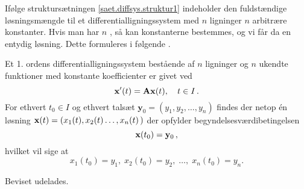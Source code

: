 Ifølge struktursætningen \ref{saet.diffsys.struktur1} indeholder den fuldstændige løsningsmængde til et differentialligningssystem med $ n $ ligninger $ n $ arbitrære konstanter. Hvis man har $ n $ , så kan konstanterne bestemmes, og vi får da en entydig løsning. Dette formuleres i følgende .

\begin{theorem} \label{saet.diffsys.eksent1}
Et 1. ordens differentialligningssystem bestående af $ n $ ligninger og $ n $ ukendte funktioner med konstante koefficienter er givet ved
\begin{equation}
\mathbf{x}'(t) = \mathbf{A} \mathbf{x}(t), \quad t \in I \,.
\end{equation}
For ethvert $t_0 \in I$ og ethvert talsæt $\mathbf y_0=(y_1,y_2,\ldots,y_n)$ findes der netop én løsning $\mathbf{x}(t)=(x_1(t),x_2(t)\ldots,x_n(t)\,)$ der opfylder begyndelsesværdibetingelsen
\begin{equation}
\mathbf{x}(t_0) = \mathbf{y}_0\,,
\end{equation}
hvilket vil sige at
\begin{equation}
x_1(t_0) = y_1,\; x_2(t_0) = y_2,\; \ldots,\; x_n(t_0) = y_n.
\end{equation}
\end{theorem}

Beviset udelades.


